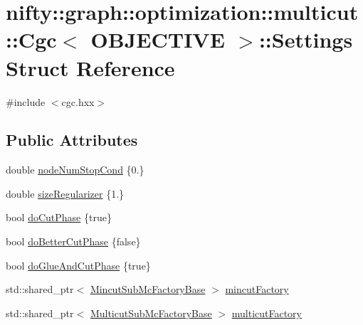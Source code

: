 \hypertarget{structnifty_1_1graph_1_1optimization_1_1multicut_1_1Cgc_1_1Settings}{}\section{nifty\+:\+:graph\+:\+:optimization\+:\+:multicut\+:\+:Cgc$<$ O\+B\+J\+E\+C\+T\+I\+V\+E $>$\+:\+:Settings Struct Reference}
\label{structnifty_1_1graph_1_1optimization_1_1multicut_1_1Cgc_1_1Settings}


{\ttfamily \#include $<$cgc.\+hxx$>$}

\subsection*{Public Attributes}
\begin{DoxyCompactItemize}
\item 
double \hyperlink{structnifty_1_1graph_1_1optimization_1_1multicut_1_1Cgc_1_1Settings_a6548eeee6ce416e6d9c55304617f4a7a}{node\+Num\+Stop\+Cond} \{0.\}
\item 
double \hyperlink{structnifty_1_1graph_1_1optimization_1_1multicut_1_1Cgc_1_1Settings_afdadff9816d3e4ea88dc64b035380bc6}{size\+Regularizer} \{1.\}
\item 
bool \hyperlink{structnifty_1_1graph_1_1optimization_1_1multicut_1_1Cgc_1_1Settings_a8a31328292f57b82bcc239ce2d59b5aa}{do\+Cut\+Phase} \{true\}
\item 
bool \hyperlink{structnifty_1_1graph_1_1optimization_1_1multicut_1_1Cgc_1_1Settings_ac7ad840411e8c31aef71822a0edf1803}{do\+Better\+Cut\+Phase} \{false\}
\item 
bool \hyperlink{structnifty_1_1graph_1_1optimization_1_1multicut_1_1Cgc_1_1Settings_aefc9e01a0efcbcde3492a21b5fc4b33d}{do\+Glue\+And\+Cut\+Phase} \{true\}
\item 
std\+::shared\+\_\+ptr$<$ \hyperlink{classnifty_1_1graph_1_1optimization_1_1multicut_1_1Cgc_a73eaf6193f5822782a586aa890d3f05a}{Mincut\+Sub\+Mc\+Factory\+Base} $>$ \hyperlink{structnifty_1_1graph_1_1optimization_1_1multicut_1_1Cgc_1_1Settings_a6738ad90cb7fce9545fd571dd2db3397}{mincut\+Factory}
\item 
std\+::shared\+\_\+ptr$<$ \hyperlink{classnifty_1_1graph_1_1optimization_1_1multicut_1_1Cgc_a6d51da2980311e5646e75fc433b4f8fb}{Multicut\+Sub\+Mc\+Factory\+Base} $>$ \hyperlink{structnifty_1_1graph_1_1optimization_1_1multicut_1_1Cgc_1_1Settings_a9f195bc5037accb73cd9d975c1b222f5}{multicut\+Factory}
\end{DoxyCompactItemize}


